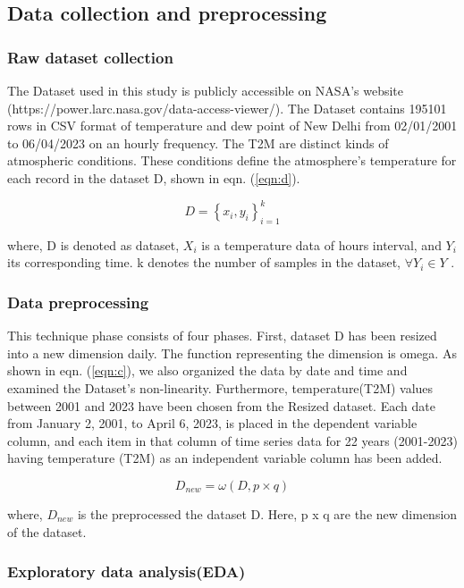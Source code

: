 \documentclass[sn-mathphys,Numbered]{sn-jnl}
\theoremstyle{thmstyleone}
\theoremstyle{thmstyletwo}
\theoremstyle{thmstylethree}
\begin{document}
\subsection{Data collection and preprocessing}
\subsubsection{Raw dataset collection}
The Dataset used in this study is publicly accessible on NASA's website (https://power.larc.nasa.gov/data-access-viewer/). The Dataset contains 195101 rows in CSV format of temperature and dew point of New Delhi from 02/01/2001 to 06/04/2023 on an hourly frequency. The T2M are distinct kinds of atmospheric conditions. These conditions define the atmosphere's temperature for each record in the dataset D, shown in eqn. (\ref{eqn:d}).

\begin{equation}
\label{eqn:d}
D=\left \{ x_i, y_i \right \}_{i=1}^{k}
\end{equation}

where, D is denoted as dataset, \(X_i\) is a temperature data of hours interval, and \(Y_i\) its corresponding time. k denotes the number of samples in the dataset, $\forall Y_i  \in Y $ .

\subsubsection{Data preprocessing}
This technique phase consists of four phases. First, dataset D has been resized into a new dimension daily. The function representing the dimension is omega. As shown in eqn. (\ref{eqn:c}), we also organized the data by date and time and examined the Dataset's non-linearity. Furthermore, temperature(T2M) values between 2001 and 2023 have been chosen from the Resized dataset. Each date from January 2, 2001, to April 6, 2023, is placed in the dependent variable column, and each item in that column of time series data for 22 years (2001-2023) having temperature (T2M) as an independent variable column has been added.

\begin{equation}
\label{eqn:c}
D_{new}=\omega \left ( D, p \times q \right )
\end{equation}

where, \(D_{new}\) is the preprocessed the dataset D. Here, p x q are the new dimension of the dataset.
\subsubsection{Exploratory data analysis(EDA)}
\end{document}
